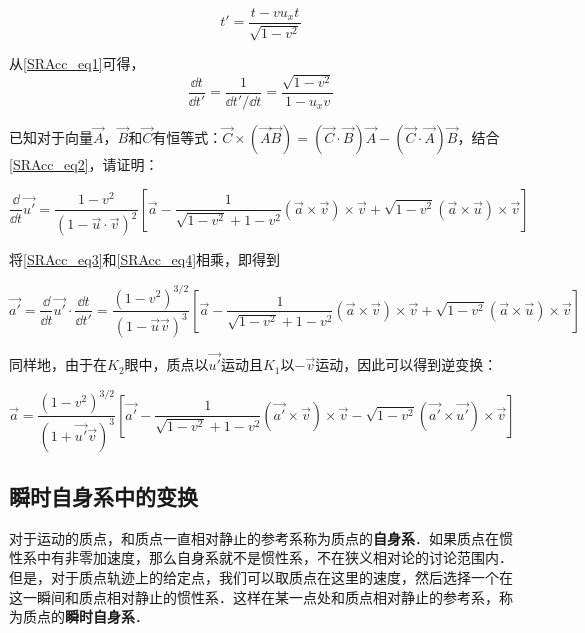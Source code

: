 \begin{equation}\label{SRAcc_eq1}
t'=\frac{t-vu_xt}{\sqrt{1-v^2}}
\end{equation}

从\autoref{SRAcc_eq1}可得，
\begin{equation}\label{SRAcc_eq3}
\frac{\dd t}{\dd t'}=\frac{1}{\dd t'/\dd t}=\frac{\sqrt{1-v^2}}{1-u_xv}
\end{equation}

\begin{exercise}{}

已知对于向量$\vec{A}$，$\vec{B}$和$\vec{C}$有恒等式：$\vec{C}\times(\vec{A}\vec{B})=(\vec{C}\cdot\vec{B})\vec{A}-(\vec{C}\cdot\vec{A})\vec{B}$，结合\autoref{SRAcc_eq2}，请证明：

\begin{equation}\label{SRAcc_eq4}
\frac{\dd}{\dd t}\vec{u'}=\frac{1-v^2}{(1-\vec{u}\cdot\vec{v})^2}[\vec{a}-\frac{1}{\sqrt{1-v^2}+1-v^2}(\vec{a}\times\vec{v})\times\vec{v}+\sqrt{1-v^2}(\vec{a}\times\vec{u})\times\vec{v}]
\end{equation}

\end{exercise}

将\autoref{SRAcc_eq3}和\autoref{SRAcc_eq4}相乘，即得到

\begin{equation}
\vec{a'}=\frac{\dd}{\dd t}\vec{u'}\cdot\frac{\dd t}{\dd t'}=\frac{(1-v^2)^{3/2}}{(1-\vec{u}\vec{v})^3}[\vec{a}-\frac{1}{\sqrt{1-v^2}+1-v^2}(\vec{a}\times\vec{v})\times\vec{v}+\sqrt{1-v^2}(\vec{a}\times\vec{u})\times\vec{v}]
\end{equation}

同样地，由于在$K_2$眼中，质点以$\vec{u'}$运动且$K_1$以$-\vec{v}$运动，因此可以得到逆变换：

\begin{equation}\label{SRAcc_eq5}
\vec{a}=\frac{(1-v^2)^{3/2}}{(1+\vec{u'}\vec{v})^3}[\vec{a'}-\frac{1}{\sqrt{1-v^2}+1-v^2}(\vec{a'}\times\vec{v})\times\vec{v}-\sqrt{1-v^2}(\vec{a'}\times\vec{u'})\times\vec{v}]
\end{equation}


\subsection{瞬时自身系中的变换}

对于运动的质点，和质点一直相对静止的参考系称为质点的\textbf{自身系}．如果质点在惯性系中有非零加速度，那么自身系就不是惯性系，不在狭义相对论的讨论范围内．但是，对于质点轨迹上的给定点，我们可以取质点在这里的速度，然后选择一个在这一瞬间和质点相对静止的惯性系．这样在某一点处和质点相对静止的参考系，称为质点的\textbf{瞬时自身系}．

